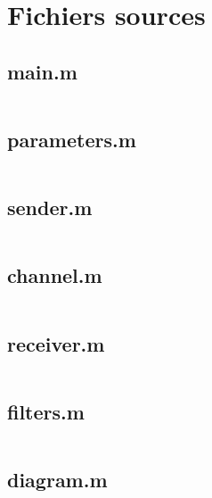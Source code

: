 \documentclass[10pt, oneside, a4paper]{article}
\begin{document}
\section{Fichiers sources}
\label{sec:fichiers-sources}

\subsection{main.m}
\inputminted{matlab}{../main.m}
\label{app:main}

\subsection{parameters.m}
\inputminted{matlab}{../parameters.m}
\label{app:paremeters}

\subsection{sender.m}
\inputminted{matlab}{../sender.m}
\label{app:sender}

\subsection{channel.m}
\inputminted{matlab}{../channel.m}
\label{app:channel}

\subsection{receiver.m}
\inputminted{matlab}{../receiver.m}
\label{app:receiver}

\subsection{filters.m}
\inputminted{matlab}{../filters.m}
\label{app:filters}

\subsection{diagram.m}
\inputminted{matlab}{../diagram.m}
\label{app:diagram}
\end{document}
